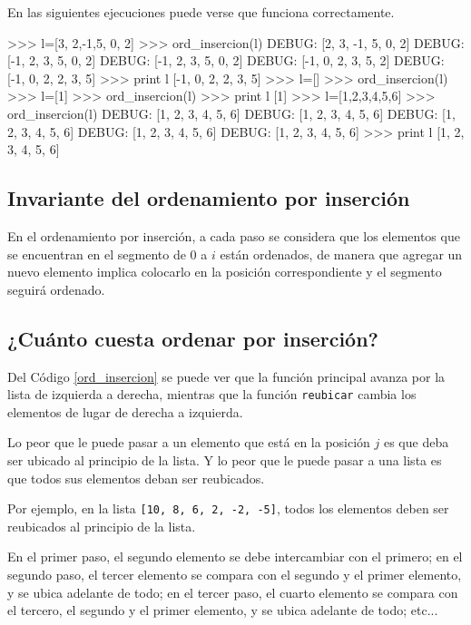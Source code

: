 En las siguientes ejecuciones puede verse que funciona correctamente.

\begin{codigo-python-sn}
>>> l=[3, 2,-1,5, 0, 2]
>>> ord_insercion(l)
DEBUG:  [2, 3, -1, 5, 0, 2]
DEBUG:  [-1, 2, 3, 5, 0, 2]
DEBUG:  [-1, 2, 3, 5, 0, 2]
DEBUG:  [-1, 0, 2, 3, 5, 2]
DEBUG:  [-1, 0, 2, 2, 3, 5]
>>> print l
[-1, 0, 2, 2, 3, 5]
>>> l=[]
>>> ord_insercion(l)
>>> l=[1]
>>> ord_insercion(l)
>>> print l
[1]
>>> l=[1,2,3,4,5,6]
>>> ord_insercion(l)
DEBUG:  [1, 2, 3, 4, 5, 6]
DEBUG:  [1, 2, 3, 4, 5, 6]
DEBUG:  [1, 2, 3, 4, 5, 6]
DEBUG:  [1, 2, 3, 4, 5, 6]
DEBUG:  [1, 2, 3, 4, 5, 6]
>>> print l
[1, 2, 3, 4, 5, 6]
\end{codigo-python-sn}

\subsection{Invariante del ordenamiento por inserción}

En el ordenamiento por inserción, a cada paso se considera que los
elementos que se encuentran en el segmento de $0$ a $i$ están ordenados, de
manera que agregar un nuevo elemento implica colocarlo en la posición
correspondiente y el segmento seguirá ordenado.

\subsection{¿Cuánto cuesta ordenar por inserción?}

Del Código \ref{ord_insercion} se puede ver que la función principal avanza por la
lista de izquierda a derecha, mientras que la función \lstinline!reubicar!
cambia los elementos de lugar de derecha a izquierda.

Lo peor que le puede pasar a un elemento que está en la posición
$j$ es que deba ser ubicado al principio de la lista.  Y lo peor que le
puede pasar a una lista es que todos sus elementos deban ser reubicados.

Por ejemplo, en la lista \lstinline+[10, 8, 6, 2, -2, -5]+, todos los
elementos deben ser reubicados al principio de la lista.

En el primer paso, el segundo elemento se debe intercambiar con el primero;
en el segundo paso, el tercer elemento se compara con el segundo y el
primer elemento, y se ubica adelante de todo; en el tercer paso, el cuarto
elemento se compara con el tercero, el segundo y el primer elemento, y se
ubica adelante de todo; etc...

